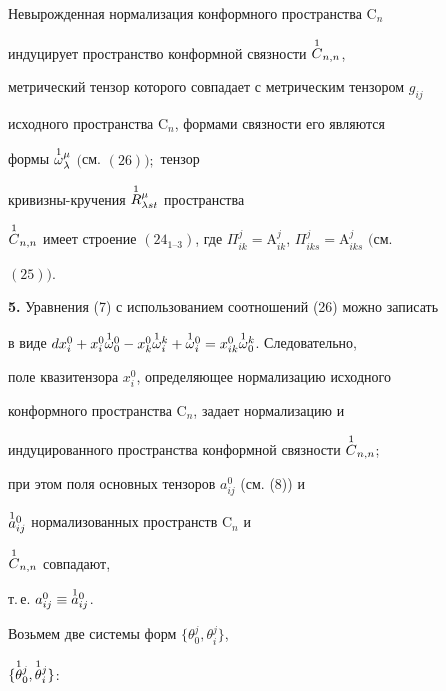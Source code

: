  


\begin{thm} 


Невырожденная нормализация конформного пространства $\mathrm C_n$ 


индуцирует пространство конформной связности $\overset{1}{C}{}{}_{n,n}$, 


метрический тензор которого совпадает с метрическим тензором $g_{i j}$ 


исходного пространства $\mathrm C_n$, формами связности его являются 


формы $\overset{1}{\omega}{}{}^\mu_\lambda$ $($см. $(26));$ тензор 


кривизны-кручения $\overset{1}{R}{}{}^\mu_{\lambda s t}$ пространства 


$\up{1}{C}{}_{n,n}$ имеет строение $(24_{1\text{--}3})$, где $\Pi^j_{i 


k}=\mathrm A^j_{i k}$, $\Pi^j_{i k s}=\mathrm A^j_{i k s}$ $($см. 


$(25))$. 


\end{thm} 


 


{\bf 5.} Уравнения (7) с использованием соотношений (26) можно записать 


в виде $d x^0_i+x^0_i\up{1}{\omega}{}^0_0-x^0_k \up{1}{\omega}{}^k_i+ 


\up{1}{\omega}{}^0_i=x^0_{i k}\up{1}{\omega}{}^k_0$. Следовательно, 


поле квазитензора $x^0_i$, определяющее нормализацию исходного 


конформного пространства $\mathrm C_n$, задает нормализацию и 


индуцированного пространства конформной связности $\overset{1}{C}{}{}_{n,n}$; 


при этом поля основных тензоров $a^0_{i j}$ (см. (8)) и 


$\overset{1}{a}{}{}^0_{i j}$ нормализованных пространств $\mathrm C_n$ и 


$\overset{1}{C}{}{}_{n,n}$ совпадают,


т.\,е. $a^0_{i j}\equiv\overset{1}{a}{}{}^0_{i j}$. 


 


Возьмем две системы форм $\{\theta^j_0,\theta^j_i\}$, 


$\{\overset{1}{\theta}{}{}^j_0,\overset{1}{\theta}{}{}^j_i\}$: 


